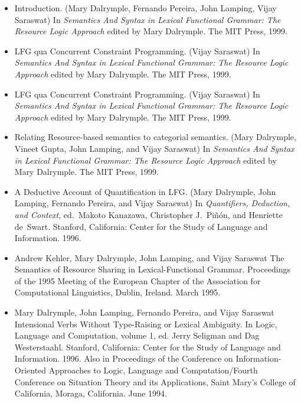\documentclass{article}
\begin{document}
\begin{itemize}

\item Introduction. (Mary Dalrymple, Fernando Pereira, John Lamping,
   Vijay Saraswat) In {\em Semantics And Syntax in Lexical Functional
   Grammar: The Resource Logic Approach} edited by Mary Dalrymple. The
   MIT Press, 1999.

\item LFG qua Concurrent Constraint Programming. (Vijay Saraswat) In
   {\em Semantics And Syntax in Lexical Functional Grammar: The Resource
    Logic Approach} edited by Mary Dalrymple. The MIT Press, 1999.

\item LFG qua Concurrent Constraint Programming. (Vijay Saraswat) In
   {\em Semantics And Syntax in Lexical Functional Grammar: The Resource
    Logic Approach} edited by Mary Dalrymple. The MIT Press, 1999.

\item Relating Resource-based semantics to categorial semantics. (Mary
    Dalrymple, Vineet Gupta, John Lamping, and Vijay Saraswat) In
   {\em Semantics And Syntax in Lexical Functional Grammar: The Resource
    Logic Approach} edited by Mary Dalrymple. The MIT Press, 1999.

\item    A Deductive Account of Quantification in LFG.  (Mary
    Dalrymple, John Lamping, Fernando Pereira, and Vijay
    Saraswat) In {\em Quantifiers, Deduction, and Context}, ed.\
    Makoto Kanazawa, Christopher J.~Pi\~{n}\'{o}n, and Henriette
    de~Swart.  Stanford, California: Center for the Study of
    Language and Information.  1996. 

\item    Andrew Kehler, Mary Dalrymple, John Lamping, and Vijay Saraswat
    The Semantics of Resource Sharing in Lexical-Functional Grammar.  
    Proceedings of the 1995 Meeting of the
    European Chapter of the Association for Computational
    Linguistics, Dublin, Ireland. March 1995.

\item    Mary Dalrymple, John Lamping, Fernando Pereira, and Vijay Saraswat
    Intensional Verbs Without Type-Raising or Lexical Ambiguity.
    In Logic, Language and Computation, volume 1, ed. Jerry
    Seligman and Dag Westerstaahl. Stanford, California:
    Center for the Study of Language and Information.  1996.
    Also in Proceedings of the Conference on
    Information-Oriented Approaches to Logic, Language and
    Computation/Fourth Conference on Situation Theory and its 
    Applications, Saint Mary's College of California, Moraga,
    California. June 1994.


\end{itemize}
\end{document}
